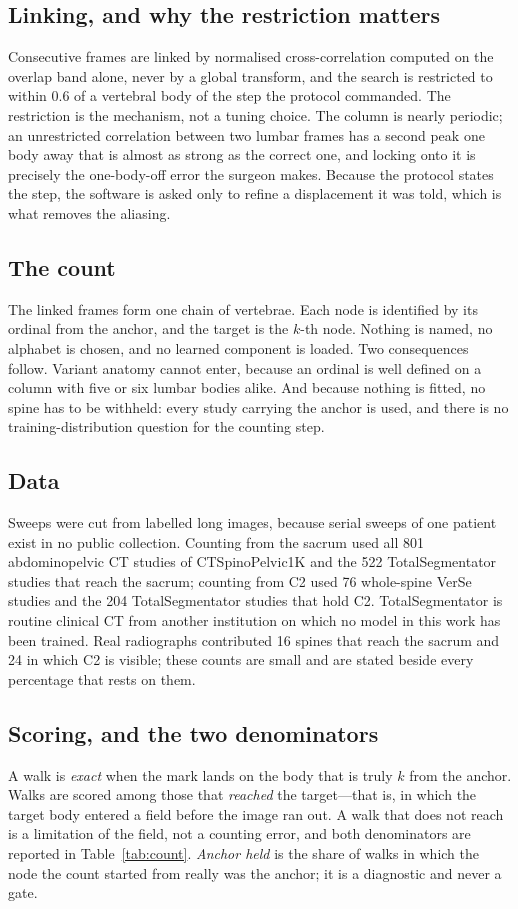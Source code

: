 \documentclass[11pt,letterpaper]{article}
\begin{document}
\subsection*{Linking, and why the restriction matters}
Consecutive frames are linked by normalised cross-correlation computed on the overlap band alone, never by
a global transform, and the search is restricted to within 0.6 of a vertebral body of the step the protocol
commanded. The restriction is the mechanism, not a tuning choice. The column is nearly periodic; an
unrestricted correlation between two lumbar frames has a second peak one body away that is almost as strong
as the correct one, and locking onto it is precisely the one-body-off error the surgeon makes. Because the
protocol states the step, the software is asked only to refine a displacement it was told, which is what
removes the aliasing.

\subsection*{The count}
The linked frames form one chain of vertebrae. Each node is identified by its ordinal from the anchor, and
the target is the $k$-th node. Nothing is named, no alphabet is chosen, and no learned component is
loaded. Two consequences follow. Variant anatomy cannot enter, because an ordinal is well defined on a
column with five or six lumbar bodies alike. And because nothing is fitted, no spine has to be withheld:
every study carrying the anchor is used, and there is no training-distribution question for the counting
step.

\subsection*{Data}
Sweeps were cut from labelled long images, because serial sweeps of one patient exist in no public
collection. Counting from the sacrum used all 801 abdominopelvic CT studies of CTSpinoPelvic1K
\citep{ctsp1k} and the 522 TotalSegmentator studies that reach the sacrum; counting from C2 used 76
whole-spine VerSe studies \citep{verse2021} and the 204 TotalSegmentator studies that hold C2.
TotalSegmentator is routine clinical CT from another institution on which no model in this work has been
trained. Real radiographs contributed 16 spines that reach the sacrum and 24 in which C2 is visible; these
counts are small and are stated beside every percentage that rests on them.

\subsection*{Scoring, and the two denominators}
A walk is \emph{exact} when the mark lands on the body that is truly $k$ from the anchor. Walks are scored
among those that \emph{reached} the target---that is, in which the target body entered a field before the
image ran out. A walk that does not reach is a limitation of the field, not a counting error, and both
denominators are reported in Table~\ref{tab:count}. \emph{Anchor held} is the share of walks in which the
node the count started from really was the anchor; it is a diagnostic and never a gate.
\end{document}
